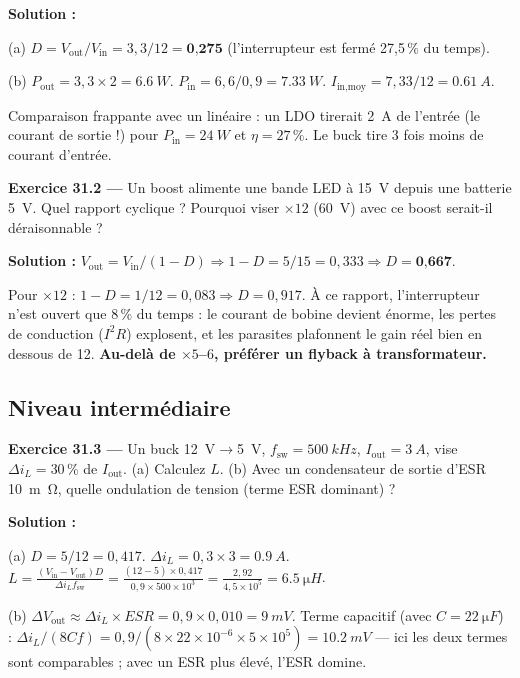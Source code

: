 \documentclass[12pt,a4paper,twoside]{book}
\begin{document}
\begin{pratique}
\textbf{Solution :}

(a) $D = V_{\text{out}}/V_{\text{in}} = 3{,}3/12 = \textbf{0,275}$ (l'interrupteur est fermé 27,5\,\% du temps).

(b) $P_{\text{out}} = 3{,}3\times2 = \SI{6.6}{W}$. $P_{\text{in}} = 6{,}6/0{,}9 = \SI{7.33}{W}$. $I_{\text{in,moy}} = 7{,}33/12 = \SI{0.61}{A}$.

Comparaison frappante avec un linéaire : un LDO tirerait \SI{2}{A} de l'entrée (le courant de sortie !) pour $P_{\text{in}} = \SI{24}{W}$ et $\eta = 27\,\%$. Le buck tire 3 fois moins de courant d'entrée.
\end{pratique}

\textbf{Exercice 31.2 ---} Un boost alimente une bande LED à \SI{15}{V} depuis une batterie \SI{5}{V}. Quel rapport cyclique ? Pourquoi viser $\times 12$ (\SI{60}{V}) avec ce boost serait-il déraisonnable ?

\begin{pratique}
\textbf{Solution :} $V_{\text{out}} = V_{\text{in}}/(1-D) \Rightarrow 1-D = 5/15 = 0{,}333 \Rightarrow D = \textbf{0,667}$.

Pour $\times 12$ : $1-D = 1/12 = 0{,}083 \Rightarrow D = 0{,}917$. À ce rapport, l'interrupteur n'est ouvert que 8\,\% du temps : le courant de bobine devient énorme, les pertes de conduction ($I^2 R$) explosent, et les parasites plafonnent le gain réel bien en dessous de 12. \textbf{Au-delà de $\times 5$--$6$, préférer un flyback à transformateur.}
\end{pratique}

\subsection*{Niveau intermédiaire}

\textbf{Exercice 31.3 ---} Un buck \SI{12}{V}$\to$\SI{5}{V}, $f_{\text{sw}} = \SI{500}{kHz}$, $I_{\text{out}} = \SI{3}{A}$, vise $\Delta i_L = 30\,\%$ de $I_{\text{out}}$. (a) Calculez $L$. (b) Avec un condensateur de sortie d'ESR \SI{10}{m\ohm}, quelle ondulation de tension (terme ESR dominant) ?

\begin{pratique}
\textbf{Solution :}

(a) $D = 5/12 = 0{,}417$. $\Delta i_L = 0{,}3\times3 = \SI{0.9}{A}$. $L = \frac{(V_{\text{in}}-V_{\text{out}})D}{\Delta i_L f_{\text{sw}}} = \frac{(12-5)\times0{,}417}{0{,}9\times500\times10^3} = \frac{2{,}92}{4{,}5\times10^5} = \SI{6.5}{\micro H}$.

(b) $\Delta V_{\text{out}} \approx \Delta i_L \times ESR = 0{,}9\times0{,}010 = \SI{9}{mV}$. Terme capacitif (avec $C = \SI{22}{\micro F}$) : $\Delta i_L/(8Cf) = 0{,}9/(8\times22\times10^{-6}\times5\times10^5) = \SI{10.2}{mV}$ --- ici les deux termes sont comparables ; avec un ESR plus élevé, l'ESR domine.
\end{pratique}
\end{document}

